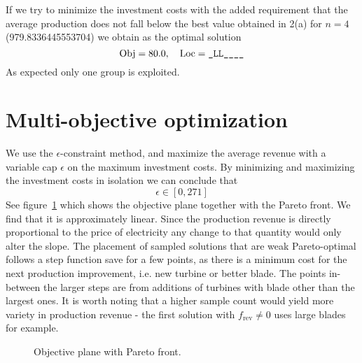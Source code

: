 \documentclass{article}
\begin{document}
If we try to minimize the investment costs with the added requirement
that the average production does not fall below
the best value obtained in 2(a) for $n=4$
(\num[round-mode=places,round-precision=2]{979.8336445553704})
we obtain as the optimal solution
$$ \text{Obj} = 80.0, \quad \text{Loc} = \verb+_LL____+ $$
As expected only one group is exploited.

\section{Multi-objective optimization}
We use the $\epsilon$\nobreakdash-constraint method,
and maximize the average revenue with
a variable cap $\epsilon$ on the maximum investment costs.
By minimizing and maximizing the investment costs in isolation
we can conclude that
$$ \epsilon \in [0, 271] $$
See figure~\ref{fig:pareto_front} which shows the objective plane
together with the Pareto front.
We find that it is approximately linear.
Since the production revenue is directly proportional to the
price of electricity any change to that quantity
would only alter the slope.
The placement of sampled solutions that are weak Pareto-optimal
follows a step function save for a few points,
as there is a minimum cost for the next production improvement,
i.e. new turbine or better blade.
The points in-between the larger steps are from additions of turbines
with blade other than the largest ones.
It is worth noting that a higher sample count would yield
more variety in production revenue -
the first solution with $f_\text{rev} \ne 0$ uses large blades for example.

\begin{figure}
	\centering
	\caption{Objective plane with Pareto front. \label{fig:pareto_front}}
\end{figure}
\end{document}
